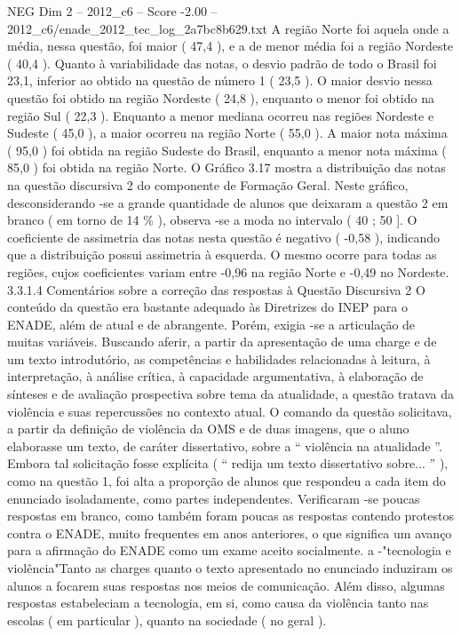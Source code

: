 \begin{textsample}{NEG Dim 2 – 2012\_c6 – Score -2.00 – 2012\_c6/enade\_2012\_tec\_log\_2a7bc8b629.txt}
A região Norte foi aquela onde a média, nessa questão, foi maior ( 47,4 ), e a de menor média foi a região Nordeste ( 40,4 ).
Quanto à variabilidade das notas, o desvio padrão de todo o Brasil foi 23,1, inferior ao obtido na questão de número 1 ( 23,5 ).
O maior desvio nessa questão foi obtido na região Nordeste ( 24,8 ), enquanto o menor foi obtido na região Sul ( 22,3 ).
Enquanto a menor mediana ocorreu nas regiões Nordeste e Sudeste ( 45,0 ), a maior ocorreu na região Norte ( 55,0 ).
A maior nota máxima ( 95,0 ) foi obtida na região Sudeste do Brasil, enquanto a menor nota máxima ( 85,0 ) foi obtida na região Norte.
O Gráfico 3.17 mostra a distribuição das notas na questão discursiva 2 do componente de Formação Geral.
Neste gráfico, desconsiderando -se a grande quantidade de alunos que deixaram a questão 2 em branco ( em torno de 14 \% ), observa -se a moda no intervalo ( 40 ; 50 ].
O coeficiente de assimetria das notas nesta questão é negativo ( -0,58 ), indicando que a distribuição possui assimetria à esquerda.
O mesmo ocorre para todas as regiões, cujos coeficientes variam entre -0,96 na região Norte e -0,49 no Nordeste. 3.3.1.4 Comentários sobre a correção das respostas à Questão Discursiva 2 O conteúdo da questão era bastante adequado às Diretrizes do INEP para o ENADE, além de atual e de abrangente.
Porém, exigia -se a articulação de muitas variáveis.
Buscando aferir, a partir da apresentação de uma charge e de um texto introdutório, as competências e habilidades relacionadas à leitura, à interpretação, à análise crítica, à capacidade argumentativa, à elaboração de sínteses e de avaliação prospectiva sobre tema da atualidade, a questão tratava da violência e suas repercussões no contexto atual.
O comando da questão solicitava, a partir da definição de violência da OMS e de duas imagens, que o aluno elaborasse um texto, de caráter dissertativo, sobre a “ violência na atualidade ”.
Embora tal solicitação fosse explícita ( “ redija um texto dissertativo sobre... ” ), como na questão 1, foi alta a proporção de alunos que respondeu a cada item do enunciado isoladamente, como partes independentes.
Verificaram -se poucas respostas em branco, como também foram poucas as respostas contendo protestos contra o ENADE, muito frequentes em anos anteriores, o que significa um avanço para a afirmação do ENADE como um exame aceito socialmente. a -"tecnologia e violência"Tanto as charges quanto o texto apresentado no enunciado induziram os alunos a focarem suas respostas nos meios de comunicação.
Além disso, algumas respostas estabeleciam a tecnologia, em si, como causa da violência tanto nas escolas ( em particular ), quanto na sociedade ( no geral ).

\end{textsample}
